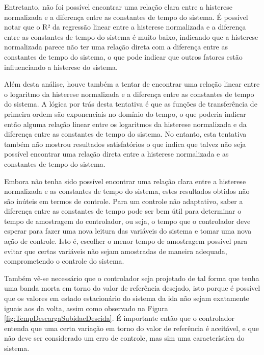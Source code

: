 Entretanto, não foi possível encontrar uma relação clara entre a histerese normalizada e a diferença entre as constantes de tempo do sistema. É possível notar que o R² da regressão linear entre a histerese normalizada e a diferença entre as constantes de tempo do sistema é muito baixo, indicando que a histerese normalizada parece não ter uma relação direta com a diferença entre as constantes de tempo do sistema, o que pode indicar que outros fatores estão influenciando a histerese do sistema.

Além desta análise, houve também a tentar de encontrar uma relação linear entre o logaritmo da histerese normalizada e a diferença entre as constantes de tempo do sistema. A lógica por trás desta tentativa é que as funções de transferência de primeira ordem são exponenciais no domínio do tempo, o que poderia indicar então alguma relação linear entre os logaritmos da histerese normalizada e da diferença entre as constantes de tempo do sistema. No entanto, esta tentativa também não mostrou resultados satisfatórios o que indica que talvez não seja possível encontrar uma relação direta entre a histerese normalizada e as constantes de tempo do sistema. 

Embora não tenha sido possível encontrar uma relação clara entre a histerese normalizada e as constantes de tempo do sistema, estes resultados obtidos não são inúteis em termos de controle.
Para um controle não adaptativo, saber a diferença entre as constantes de tempo pode ser bem útil para determinar o tempo de amostragem do controlador, ou seja, o tempo que o controlador deve esperar para fazer uma nova leitura das variáveis do sistema e tomar uma nova ação de controle. Isto é, escolher o menor tempo de amostragem possível para evitar que certas variáveis não sejam amostradas de maneira adequada, comprometendo o controle do sistema.

Também vê-se necessário que o controlador seja projetado de tal forma que tenha uma banda morta em torno do valor de referência desejado, isto porque é possível que os valores em estado estacionário do sistema da ida não sejam exatamente iguais aos da volta, assim como observado na Figura \ref{fig:TempDescargaSubidaeDescida}. É importante então que o controlador entenda que uma certa variação em torno do valor de referência é aceitável, e que não deve ser considerado um erro de controle, mas sim uma característica do sistema.

